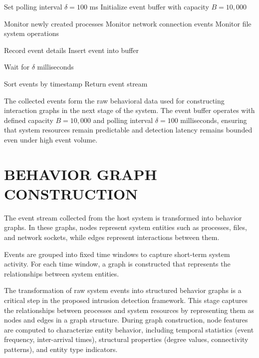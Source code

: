 \begin{algorithm}
\caption{Real-Time System Event Collection}
\begin{algorithmic}[1]

\State Set polling interval $\delta = 100$ ms
\State Initialize event buffer with capacity $B = 10,000$


\State Monitor newly created processes
\State Monitor network connection events
\State Monitor file system operations

\State Record event details
\State Insert event into buffer
\EndFor

\State Wait for $\delta$ milliseconds

\EndWhile

\State Sort events by timestamp
\State Return event stream

\end{algorithmic}
\end{algorithm}

The collected events form the raw behavioral data used for constructing interaction graphs in the next stage of the system. The event buffer operates with defined capacity $B = 10,000$ and polling interval $\delta = 100$ milliseconds, ensuring that system resources remain predictable and detection latency remains bounded even under high event volume.



\section{\uppercase{BEHAVIOR GRAPH CONSTRUCTION}}

The event stream collected from the host system is transformed into behavior graphs. In these graphs, nodes represent system entities such as processes, files, and network sockets, while edges represent interactions between them.

Events are grouped into fixed time windows to capture short-term system activity. For each time window, a graph is constructed that represents the relationships between system entities.

The transformation of raw system events into structured behavior graphs is a critical step in the proposed intrusion detection framework. This stage captures the relationships between processes and system resources by representing them as nodes and edges in a graph structure. During graph construction, node features are computed to characterize entity behavior, including temporal statistics (event frequency, inter-arrival times), structural properties (degree values, connectivity patterns), and entity type indicators.

